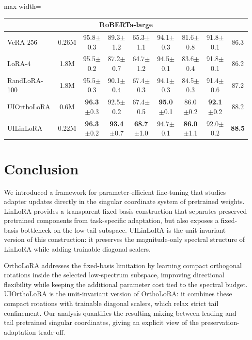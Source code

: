\documentclass{article}
\begin{document}
\begin{table}[ht]
\begin{adjustbox}{max width=\linewidth}
\begin{tabular}{@{}lcccccccc@{}}
\midrule
\multicolumn{9}{c}{\textbf{RoBERTa-large}} \\
\midrule
VeRA-256     & 0.26M & 95.8{\scriptsize$\pm$0.3} & 89.3{\scriptsize$\pm$1.2} & 65.3{\scriptsize$\pm$1.1} & 94.1{\scriptsize$\pm$0.3} & 81.6{\scriptsize$\pm$0.8} & 91.8{\scriptsize$\pm$0.1} & 86.3 \\
LoRA-4       & 1.8M  & 95.5{\scriptsize$\pm$0.2} & 87.2{\scriptsize$\pm$0.7} & 64.7{\scriptsize$\pm$1.2} & 94.5{\scriptsize$\pm$0.1} & 83.6{\scriptsize$\pm$0.4} & 91.8{\scriptsize$\pm$0.1} & 86.2 \\
RandLoRA-100 & 1.8M  & 95.5{\scriptsize$\pm$0.3} & 90.1{\scriptsize$\pm$0.4} & 67.4{\scriptsize$\pm$0.3} & 94.1{\scriptsize$\pm$0.3} & 84.5{\scriptsize$\pm$0.3} & 91.4{\scriptsize$\pm$0.6} & 87.2 \\
\addlinespace
UIOrthoLoRA  & 0.6M    & \textbf{96.3}{\scriptsize$\pm$0.3} & 92.5{\scriptsize$\pm$0.2} & 67.4{\scriptsize$\pm$0.5} & \textbf{95.0}{\scriptsize$\pm$0.1} & 86.0{\scriptsize$\pm 0.2$} & \textbf{92.1}{\scriptsize$\pm$0.2} & 88.2 \\
UILinLoRA    & 0.22M    & \textbf{96.3}{\scriptsize$\pm$0.2} & \textbf{93.4}{\scriptsize$\pm$0.7} & \textbf{68.7}{\scriptsize$\pm$1.0} & 94.7{\scriptsize$\pm$0.1} & \textbf{86.0}{\scriptsize$\pm$1.1} & 92.0{\scriptsize$\pm$0.2} & \textbf{88.5} \\

\bottomrule
\end{tabular}
\end{adjustbox}

\vspace{0.3em}
\end{table}


\section{Conclusion}

We introduced a framework for parameter-efficient fine-tuning that studies adapter updates directly in the singular coordinate system of pretrained weights. LinLoRA provides a transparent fixed-basis construction that separates preserved pretrained components from task-specific adaptation, but also exposes a fixed-basis bottleneck on the low-tail subspace. UILinLoRA is the unit-invariant version of this construction: it preserves the magnitude-only spectral structure of LinLoRA while adding trainable diagonal scalers.

OrthoLoRA addresses the fixed-basis limitation by learning compact orthogonal rotations inside the selected low-spectrum subspace, improving directional flexibility while keeping the additional parameter cost tied to the spectral budget. UIOrthoLoRA is the unit-invariant version of OrthoLoRA: it combines these compact rotations with trainable diagonal scalers, which relax strict tail confinement. Our analysis quantifies the resulting mixing between leading and tail pretrained singular coordinates, giving an explicit view of the preservation-adaptation trade-off.
\end{document}
